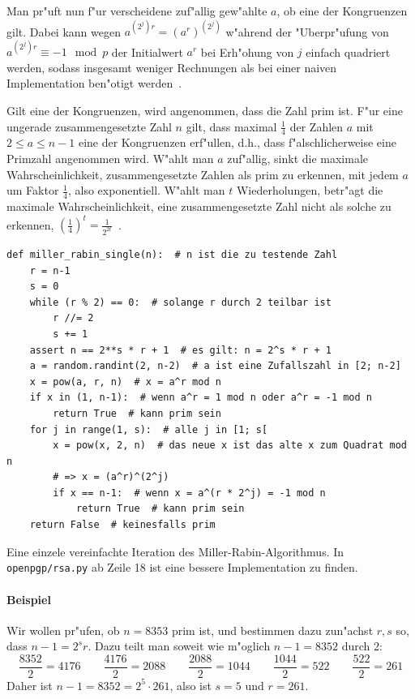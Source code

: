 \documentclass[12pt]{article}
\begin{document}
Man pr"uft nun f"ur verscheidene zuf"allig gew"ahlte $a$, ob eine der Kongruenzen gilt.
Dabei kann wegen $a^{(2^j)r} = (a^r)^{(2^j)}$ w"ahrend der "Uberpr"ufung von
$a^{(2^j)r} \equiv -1 \mod p$ der Initialwert $a^r$ bei Erh"ohung von $j$ einfach quadriert werden,
sodass insgesamt weniger Rechnungen als bei einer naiven Implementation ben"otigt werden~\cite{hac}.

Gilt eine der Kongruenzen, wird angenommen, dass die Zahl prim ist.
F"ur eine ungerade zusammengesetzte Zahl $n$ gilt,
dass maximal $\frac{1}{4}$ der Zahlen $a$ mit $2 \leq a \leq n-1$ eine der Kongruenzen erf"ullen,
d.h., dass f"alschlicherweise eine Primzahl angenommen wird.
W"ahlt man $a$ zuf"allig, sinkt die maximale Wahrscheinlichkeit, zusammengesetzte Zahlen als prim zu erkennen,
mit jedem $a$ um Faktor $\frac{1}{4}$, also exponentiell.
W"ahlt man $t$ Wiederholungen, betr"agt die maximale Wahrscheinlichkeit, eine zusammengesetzte Zahl nicht als solche zu erkennen,
$\left(\frac{1}{4}\right)^t = \frac{1}{2^{2t}}$~\cite{hac}.

\begin{code-snip}
\begin{lstlisting}
def miller_rabin_single(n):  # n ist die zu testende Zahl
    r = n-1
    s = 0
    while (r % 2) == 0:  # solange r durch 2 teilbar ist
        r //= 2
        s += 1
    assert n == 2**s * r + 1  # es gilt: n = 2^s * r + 1
    a = random.randint(2, n-2)  # a ist eine Zufallszahl in [2; n-2]
    x = pow(a, r, n)  # x = a^r mod n
    if x in (1, n-1):  # wenn a^r = 1 mod n oder a^r = -1 mod n
        return True  # kann prim sein
    for j in range(1, s):  # alle j in [1; s[
        x = pow(x, 2, n)  # das neue x ist das alte x zum Quadrat mod n
        # => x = (a^r)^(2^j)
        if x == n-1:  # wenn x = a^(r * 2^j) = -1 mod n
            return True  # kann prim sein
    return False  # keinesfalls prim
\end{lstlisting}
\caption{Eine einzele vereinfachte Iteration des Miller-Rabin-Algorithmus.
In \texttt{openpgp/rsa.py} ab Zeile 18 ist eine bessere Implementation zu finden.}
\label{code:miller-rabin}
\end{code-snip}

\paragraph{Beispiel}
Wir wollen pr"ufen, ob $n = 8353$ prim ist, und bestimmen dazu zun"achst $r, s$ so, dass $n - 1 = 2^s r$.
Dazu teilt man soweit wie m"oglich $n-1 = 8352$ durch 2:
\[ \frac{8352}{2} = 4176 \qquad \frac{4176}{2} = 2088 \qquad \frac{2088}{2} = 1044 \qquad
\frac{1044}{2} = 522 \qquad \frac{522}{2} = 261 \]
Daher ist $n-1 = 8352 = 2^5 \cdot 261$, also ist $s = 5$ und $r = 261$.
\end{document}
